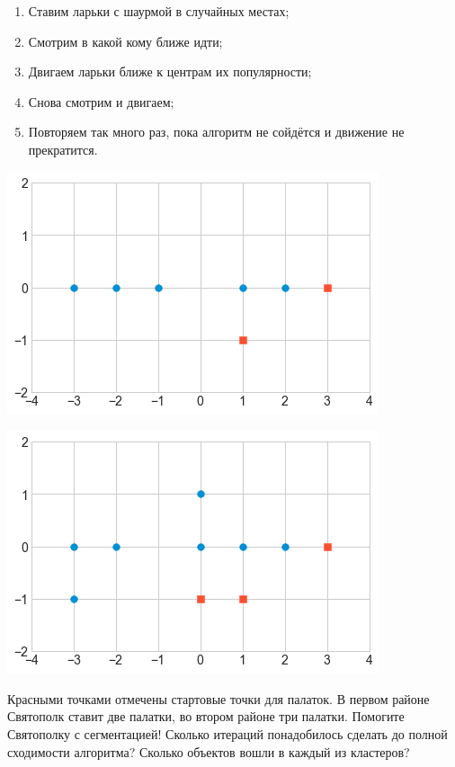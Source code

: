 \documentclass[12pt, a4paper, oneside]{article}
\begin{document}
\begin{enumerate}
	\item Ставим ларьки с шаурмой в случайных местах;
	\item Смотрим в какой кому ближе идти;
	\item Двигаем ларьки ближе к центрам их популярности;
	\item Снова смотрим и двигаем;
	\item Повторяем так много раз, пока алгоритм не сойдётся и движение не прекратится.
\end{enumerate}

\begin{minipage}[t]{0.45\textwidth}
\includegraphics[scale=0.5]{knn1.png}
\end{minipage}
\hfill
\begin{minipage}[t]{0.45\textwidth}
\includegraphics[scale=0.5]{knn2.png}
\end{minipage}

Красными точками отмечены стартовые точки для палаток. В первом районе Святополк ставит две палатки, во втором районе три палатки.  Помогите Святополку с сегментацией! Сколько итераций понадобилось сделать до полной сходимости алгоритма? Сколько объектов вошли в каждый из кластеров?  
\end{document}

